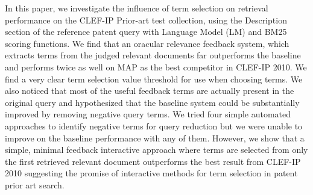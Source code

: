 In this paper, we investigate the influence of term selection on retrieval
performance on the CLEF-IP Prior-art test collection, using the Description section of the reference patent query with Language Model (LM) and BM25 scoring functions. We find that an oracular relevance feedback system,
which extracts terms from the judged relevant documents far
outperforms the baseline and performs twice as well on MAP as the best
competitor in CLEF-IP 2010.  We find a very clear term selection value
threshold for use when choosing terms.  We also noticed that most of
the useful feedback terms are actually present in the original query
and hypothesized that the baseline system could be substantially
improved by removing negative query terms.
We tried four simple automated approaches to identify negative terms
for query reduction but we were unable to improve on the baseline
performance with any of them.  However, we show that a
simple, minimal feedback interactive approach where terms are selected
from only the first retrieved relevant document outperforms the best
result from CLEF-IP 2010 suggesting the promise of interactive methods
for term selection in patent prior art search.

\begin{comment}
We investigate the influence of term selection on retrieval performance on the CLEF-IP Prior Art test collection, starting with the Description section of the reference patent and using LM and BM25 scoring functions.    We find that an oracular relevance feedback system which extracts terms from the judged relevant documents far outperforms the baseline and  performs twice as well on MAP as the best competitor in CLEF-2014.  We find a very clear term selection value threshold for use when choosing terms.  A much more realistic approach in which feedback terms are extracted only from the first relevant document retrieved, still outperforms last year’s winner.   We noticed that most of the useful feedback terms are actually present in the original query and hypothesized that the baseline system could be substantially improved by removing negative query terms.  We tried three different approaches to identifying negative terms but were unable to improve on the baseline performance with any of them.
\end{comment}

